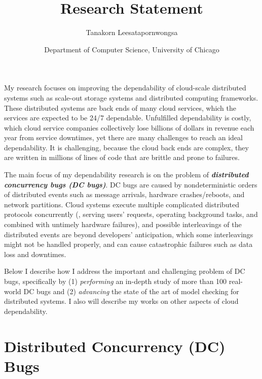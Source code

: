 \documentclass[10pt]{article}
\begin{document}
\title{Research Statement}
\author{Tanakorn Leesatapornwongsa}
\date{\vspace{-1ex} \small{Department of Computer Science, University of
Chicago}}

\maketitle

My research focuses on improving the dependability of cloud-scale distributed
systems such as scale-out storage systems and distributed computing frameworks.
These distributed systems are back ends of many cloud services, which the
services are expected to be 24/7 dependable. Unfulfilled dependability is
costly, which cloud service companies collectively lose billions of dollars in
revenue each year from service downtimes, yet there are many challenges to reach
an ideal dependability. It is challenging, because the cloud back ends are
complex, they are written in millions of lines of code that are brittle and
prone to failures.

The main focus of my dependability research is on the problem of
\textbf{\textit{distributed concurrency bugs (DC bugs)}}. DC bugs are caused by
nondeterministic orders of distributed events such as message arrivals,
hardware crashes/reboots, and network partitions. Cloud systems execute
multiple complicated distributed protocols concurrently (\eg, serving users'
requests, operating background tasks, and combined with untimely hardware
failures), and possible interleavings of the distributed events are beyond
developers' anticipation, which some interleavings might not be handled
properly, and can cause catastrophic failures such as data loss and downtimes.

Below I describe how I address the important and challenging problem of DC bugs,
specifically by (1) \textit{performing} an in-depth study of more than 100
real-world DC bugs and (2) \textit{advancing} the state of the art of model
checking for distributed systems. I also will describe my works on other aspects
of cloud dependability.

\section{Distributed Concurrency (DC) Bugs}\label{dcbugs}

\end{document}
